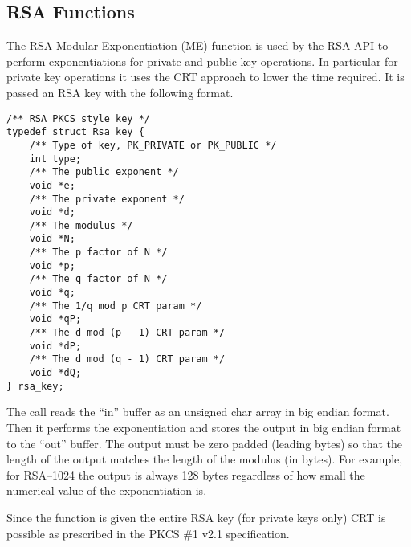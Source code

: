 \documentclass[a4paper]{book}
\begin{document}
\subsection{RSA Functions}
The RSA Modular Exponentiation (ME) function is used by the RSA API to perform exponentiations for private and public key operations.  In particular for
private key operations it uses the CRT approach to lower the time required.  It is passed an RSA key with the following format.

\begin{verbatim}
/** RSA PKCS style key */
typedef struct Rsa_key {
    /** Type of key, PK_PRIVATE or PK_PUBLIC */
    int type;
    /** The public exponent */
    void *e; 
    /** The private exponent */
    void *d; 
    /** The modulus */
    void *N; 
    /** The p factor of N */
    void *p; 
    /** The q factor of N */
    void *q; 
    /** The 1/q mod p CRT param */
    void *qP; 
    /** The d mod (p - 1) CRT param */
    void *dP; 
    /** The d mod (q - 1) CRT param */
    void *dQ;
} rsa_key;
\end{verbatim}

The call reads the ``in'' buffer as an unsigned char array in big endian format.  Then it performs the exponentiation and stores the output in big endian format
to the ``out'' buffer.  The output must be zero padded (leading bytes) so that the length of the output matches the length of the modulus (in bytes).  For example,
for RSA--1024 the output is always 128 bytes regardless of how small the numerical value of the exponentiation is.

Since the function is given the entire RSA key (for private keys only) CRT is possible as prescribed in the PKCS \#1 v2.1 specification.


\end{document}
